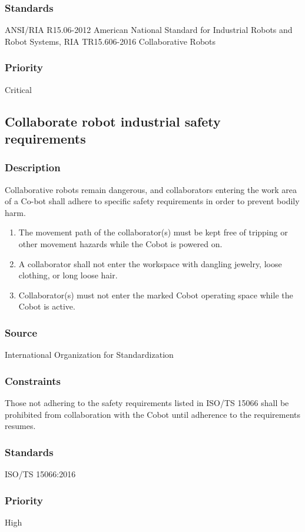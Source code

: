 \subsubsection{Standards}
ANSI/RIA R15.06-2012 American National Standard for Industrial Robots and Robot Systems, RIA TR15.606-2016 Collaborative Robots
\subsubsection{Priority}
Critical

\subsection{Collaborate robot industrial safety requirements}
\subsubsection{Description}
Collaborative robots remain dangerous, and collaborators entering the work area of a Co-bot shall adhere to specific safety requirements in order to prevent bodily harm. 
\begin{enumerate}
  \item The movement path of the collaborator(s) must be kept free of tripping or other movement hazards while the Cobot is powered on.
  \item A collaborator shall not enter the workspace with dangling jewelry, loose clothing, or long loose hair.
  \item Collaborator(s) must not enter the marked Cobot operating space while the Cobot is active.
\end{enumerate}
\subsubsection{Source}
International Organization for Standardization
\subsubsection{Constraints}
    Those not adhering to the safety requirements listed in ISO/TS 15066 shall be prohibited from collaboration with the Cobot until adherence to the requirements resumes.
\subsubsection{Standards}
ISO/TS 15066:2016
\subsubsection{Priority}
High

